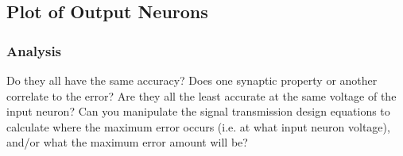 \documentclass[12pt, letterpaper, oneside, notitlepage, onecolumn]{article}
\begin{document}
\subsection{Plot of Output Neurons}


\subsubsection{Analysis}

Do they all have the same accuracy? Does one synaptic property or another
correlate to the error? Are they all the least accurate at the same voltage 
of the input neuron? Can you manipulate the signal transmission design 
equations to calculate where the maximum error occurs (i.e. at what input 
neuron voltage), and/or what the maximum error amount will be?
\end{document}
